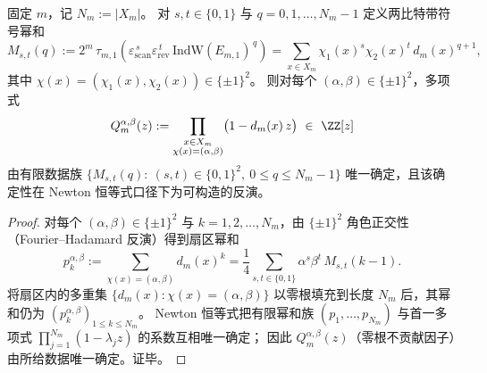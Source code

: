 \begin{proposition}\label{prop:fold-chi-layered-fiber-spectrum-certified-by-signed-powersums}
固定 \(m\)，记 \(N_m:=|X_m|\)。
对 \(s,t\in\{0,1\}\) 与 \(q=0,1,\dots,N_m-1\) 定义两比特带符号幂和
\[
M_{s,t}(q)
:=
2^m\,\tau_{m,1}\!\left(\varepsilon_{\mathrm{scan}}^{\,s}\varepsilon_{\mathrm{rev}}^{\,t}\,\mathrm{IndW}(E_{m,1})^{\,q}\right)
=
\sum_{x\in X_m}\chi_1(x)^s\chi_2(x)^t\,d_m(x)^{q+1},
\]
其中 \(\chi(x)=(\chi_1(x),\chi_2(x))\in\{\pm1\}^2\)。
则对每个 \((\alpha,\beta)\in\{\pm1\}^2\)，多项式
\[
Q_m^{\alpha,\beta}(z):=
\prod_{\substack{x\in X_m\\ \chi(x)=(\alpha,\beta)}}\bigl(1-d_m(x)\,z\bigr)\ \in\ \ZZ[z]
\]
由有限数据族
\(
\{M_{s,t}(q):\ (s,t)\in\{0,1\}^2,\ 0\le q\le N_m-1\}
\)
唯一确定，且该确定性在 Newton 恒等式口径下为可构造的反演。
\end{proposition}
\begin{proof}
对每个 \((\alpha,\beta)\in\{\pm1\}^2\) 与 \(k=1,2,\dots,N_m\)，由 \(\{\pm1\}^2\) 角色正交性（Fourier--Hadamard 反演）得到扇区幂和
\[
p_k^{\alpha,\beta}
:=
\sum_{\chi(x)=(\alpha,\beta)} d_m(x)^k
=
\frac14\sum_{s,t\in\{0,1\}}\alpha^s\beta^t\,M_{s,t}(k-1).
\]
将扇区内的多重集 \(\{d_m(x):\chi(x)=(\alpha,\beta)\}\) 以零根填充到长度 \(N_m\) 后，其幂和仍为 \((p_k^{\alpha,\beta})_{1\le k\le N_m}\)。
Newton 恒等式把有限幂和族 \((p_1,\dots,p_{N_m})\) 与首一多项式
\(
\prod_{j=1}^{N_m}(1-\lambda_j z)
\)
的系数互相唯一确定；
因此 \(Q_m^{\alpha,\beta}(z)\)（零根不贡献因子）由所给数据唯一确定。证毕。
\end{proof}

